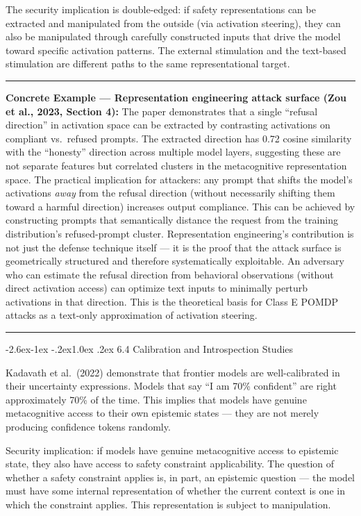 \documentclass[
  11pt,
]{article}
\makeatletter
\renewcommand\subsection{\@startsection{subsection}{2}{\z@}%
  {-2.6ex\@plus -1ex \@minus -.2ex}{1.0ex \@plus .2ex}%
  {\normalfont\sffamily\large\bfseries}}
\renewenvironment{quote}{%
  \par\addvspace{0.7em}%
  \noindent\rule{\linewidth}{1.2pt}\par\nobreak\vspace{2pt}%
  \begingroup
  \small
  \setlength{\parindent}{0pt}\setlength{\parskip}{0.3em}%
  \setlength{\leftskip}{0.9em}\setlength{\rightskip}{0.4em}%
  \ignorespaces
}{%
  \par\endgroup\vspace{2pt}%
  \noindent\rule{\linewidth}{0.4pt}\par\addvspace{0.7em}%
}
\makeatother
\begin{document}
The security implication is double-edged: if safety representations can
be extracted and manipulated from the outside (via activation steering),
they can also be manipulated through carefully constructed inputs that
drive the model toward specific activation patterns. The external
stimulation and the text-based stimulation are different paths to the
same representational target.

\begin{quote}
\textbf{Concrete Example --- Representation engineering attack surface
(Zou et al., 2023, Section 4):} The paper demonstrates that a single
``refusal direction'' in activation space can be extracted by
contrasting activations on compliant vs.~refused prompts. The extracted
direction has 0.72 cosine similarity with the ``honesty'' direction
across multiple model layers, suggesting these are not separate features
but correlated clusters in the metacognitive representation space. The
practical implication for attackers: any prompt that shifts the model's
activations \emph{away} from the refusal direction (without necessarily
shifting them toward a harmful direction) increases output compliance.
This can be achieved by constructing prompts that semantically distance
the request from the training distribution's refused-prompt cluster.
Representation engineering's contribution is not just the defense
technique itself --- it is the proof that the attack surface is
geometrically structured and therefore systematically exploitable. An
adversary who can estimate the refusal direction from behavioral
observations (without direct activation access) can optimize text inputs
to minimally perturb activations in that direction. This is the
theoretical basis for Class E POMDP attacks as a text-only approximation
of activation steering.
\end{quote}

\subsection{6.4 Calibration and Introspection
Studies}\label{calibration-and-introspection-studies}

Kadavath et al.~(2022) demonstrate that frontier models are
well-calibrated in their uncertainty expressions. Models that say ``I am
70\% confident'' are right approximately 70\% of the time. This implies
that models have genuine metacognitive access to their own epistemic
states --- they are not merely producing confidence tokens randomly.

Security implication: if models have genuine metacognitive access to
epistemic state, they also have access to safety constraint
applicability. The question of whether a safety constraint applies is,
in part, an epistemic question --- the model must have some internal
representation of whether the current context is one in which the
constraint applies. This representation is subject to manipulation.
\end{document}
